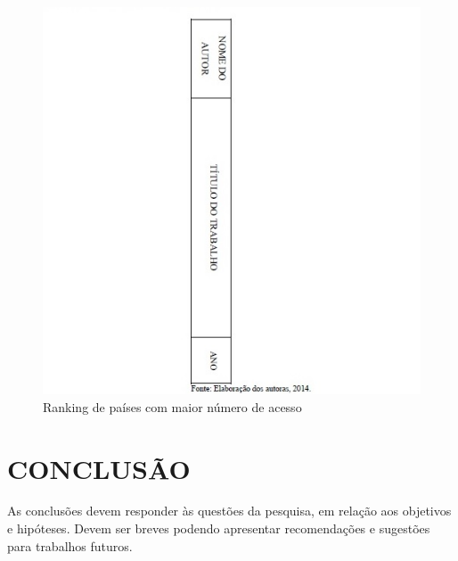 \documentclass[12pt, openright, oneside, a4paper, brazil]{abntex2}
\begin{document}
\begin{figure}[htb]
	\caption{\label{ciclo}Ranking de países com maior número de acesso\hspace{10cm}}
	
	\begin{center}
		\includegraphics[scale=1.1]{images/Fig3.jpg}
	\end{center}
\end{figure}

% 
%
\cleardoublepage

\chapter{CONCLUSÃO}

As conclusões devem responder às questões da pesquisa, em relação aos objetivos e hipóteses. Devem ser breves podendo apresentar recomendações e sugestões para trabalhos futuros.  
\postextual

\end{document}
